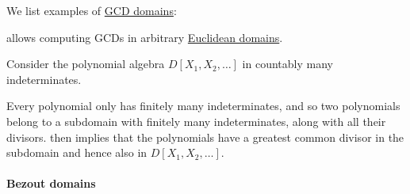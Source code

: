 \begin{example}\label{ex:def:gcd_domain}
  We list examples of \hyperref[def:gcd_domain]{GCD domains}:
  \begin{thmenum}
      allows computing GCDs in arbitrary \hyperref[def:euclidean_domain]{Euclidean domains}.

     Consider the polynomial algebra \( D[X_1, X_2, \ldots] \) in countably many indeterminates.

    Every polynomial only has finitely many indeterminates, and so two polynomials belong to a subdomain with finitely many indeterminates, along with all their divisors.  then implies that the polynomials have a greatest common divisor in the subdomain and hence also in \( D[X_1, X_2, \ldots] \).
  \end{thmenum}
\end{example}

\paragraph{Bezout domains}


